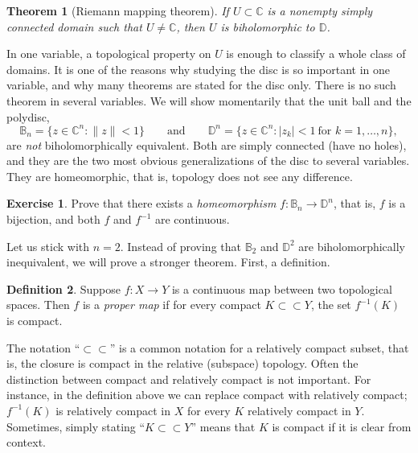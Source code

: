\documentclass[12pt,openany]{book}
\newcommand{\sabs}[1]{\lvert {#1} \rvert}
\newcommand{\snorm}[1]{\lVert {#1} \rVert}
\newcommand{\C}{{\mathbb{C}}}
\newcommand{\D}{{\mathbb{D}}}
\newcommand{\bB}{{\mathbb{B}}}
\newcommand{\myindex}[1]{#1\index{#1}}
\theoremstyle{plain}
\newtheorem{thm}{Theorem}[section]
\theoremstyle{remark}
\theoremstyle{definition}
\newtheorem{defn}[thm]{Definition}
\newenvironment{exbox}{%
    \def\FrameCommand{\vrule width 1pt \relax\hspace{10pt}}%
    \MakeFramed{\advance\hsize-\width\FrameRestore}%
}{%
    \endMakeFramed
}
\theoremstyle{exercise}
\newtheorem{exercise}{Exercise}[section]
\theoremstyle{example}
\begin{document}
\begin{thm}[Riemann mapping theorem]
If $U \subset \C$ is a nonempty simply connected domain such that $U \neq \C$,
then $U$ is biholomorphic to $\D$.
\end{thm}

In one variable, a topological property on $U$ is enough to classify a whole
class of domains.  It is one of the reasons why studying the disc is so
important in one variable, and why many theorems are stated for
the disc only.
There is no such theorem in several variables.
We will show momentarily that the unit ball and the polydisc,
\begin{equation*}
\bB_n = \bigl\{ z \in \C^n : \snorm{z} < 1 \bigr\}
\qquad \text{and} \qquad
\D^n = \bigl\{ z \in \C^n : \sabs{z_k} < 1 ~\text{for $k=1,\ldots,n$} \bigr\} ,
\end{equation*}
are \emph{not} biholomorphically equivalent.  Both are simply
connected (have no holes), and they are the two most obvious generalizations
of the disc to several variables.  They are homeomorphic, that is, topology
does not see any difference.

\begin{exbox}
\begin{exercise}
Prove that there exists a \emph{\myindex{homeomorphism}} $f \colon \bB_n \to
\D^n$,
that is, $f$ is a bijection, and both $f$ and $f^{-1}$ are continuous.
\end{exercise}
\end{exbox}


Let us stick with $n=2$.
Instead of proving that $\bB_2$ and
$\D^2$ are biholomorphically
inequivalent, we will prove a stronger theorem.  First, a
definition.

\begin{defn}
Suppose $f \colon X \to Y$ is a continuous map between two topological
spaces.  Then $f$ is a \emph{\myindex{proper map}} if for every compact
%
%
$K \subset \subset Y$, the set $f^{-1}(K)$ is compact.
\end{defn}

The notation ``$\subset \subset$'' is a common notation for a relatively
compact subset, that is, the closure is compact in the relative (subspace)
topology.  Often the distinction between compact and relatively
compact is not important.  For instance, in the definition above we can replace
compact with relatively compact;
$f^{-1}(K)$ is relatively compact
in $X$ for every $K$ relatively compact in $Y$.
Sometimes, simply stating ``$K \subset \subset Y$''
means that $K$ is compact if it is clear from context.
\end{document}
